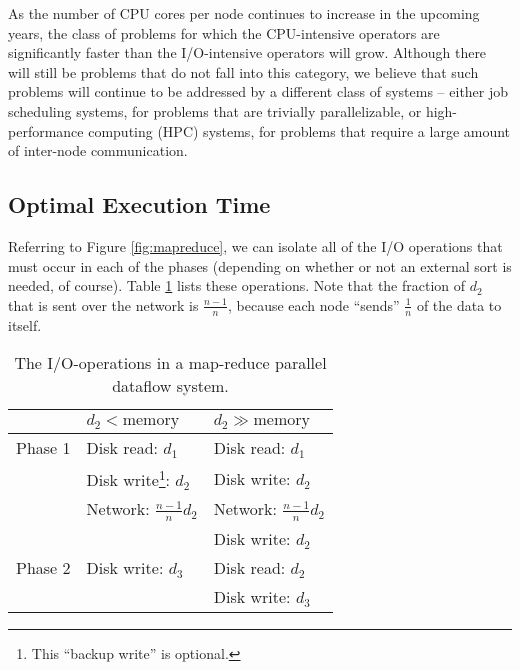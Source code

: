 \documentclass{acm_proc_article-sp}
\begin{document}
As the number of CPU cores per node continues to increase in the upcoming
years, the class of problems for which the CPU-intensive operators are
significantly faster than the I/O-intensive operators will grow. Although there
will still be problems that do not fall into this category, we believe that
such problems will continue to be addressed by a different class of systems --
either job scheduling systems, for problems that are trivially parallelizable, or high-performance computing (HPC)
systems, for problems that require a large amount of inter-node communication.

\subsection{Optimal Execution Time}

Referring to Figure \ref{fig:mapreduce}, we can isolate all of the I/O
operations that must occur in each of the phases (depending on whether or not
an external sort is needed, of course). Table \ref{table:operations1} lists
these operations. Note that the fraction of $d_2$ that is sent
over the network is $\frac{n-1}{n}$, because each node ``sends'' $\frac{1}{n}$ of the data to itself.

\begin{table}
\centering
\begin{minipage}{0.5\textwidth}
\centering
\renewcommand{\arraystretch}{1.2}
\begin{tabular}{|l|l|l|}
\hline
        & $d_2 < \text{memory}$          & $d_2 \gg \text{memory}$ \\ \hline
Phase 1 & Disk read:  $d_1$              & Disk read:  $d_1$ \\ 
        & Disk write\footnote{This ``backup write'' is optional.}: $d_2$ & Disk write: $d_2$ \\
        & Network: $\frac{n-1}{n} d_2$   & Network: $\frac{n-1}{n} d_2$ \\
        &                                & Disk write: $d_2$ \\ \hline
Phase 2 & Disk write: $d_3$              & Disk read: $d_2$ \\
        &                                & Disk write: $d_3$ \\ \hline
\end{tabular}
\caption{The I/O-operations in a map-reduce parallel dataflow system.}
\label{table:operations1}
\end{minipage}
\end{table}
\end{document}
